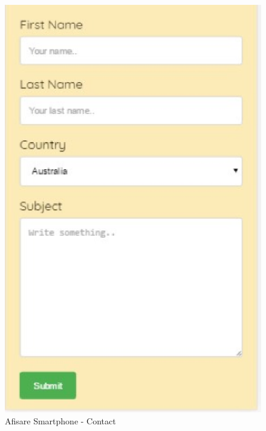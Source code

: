 \documentclass[11pt]{article}
\begin{document}
\begin{figure}[h]
\includegraphics{images/9.eps}
\caption{Afisare Smartphone - Contact}
\end{figure}
\end{document}
